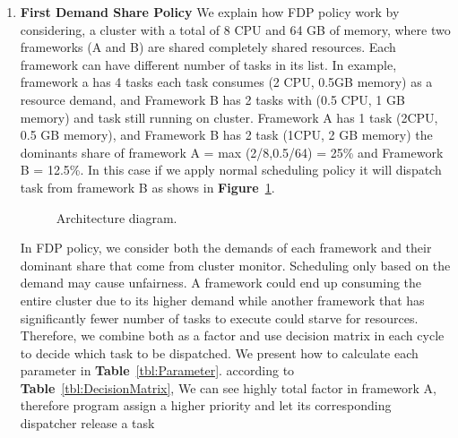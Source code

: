 \documentclass[12pt,oneside,openright,a4paper]{cpe-english-project}
\begin{document}
\begin{enumerate}
  \item \textbf{First Demand Share Policy} We explain how FDP policy work by considering, a cluster with a total of 8 CPU and 64 GB of memory, where two frameworks (A and B) are shared completely shared resources. Each framework can have different number of tasks in its list. In example, framework a has 4 tasks each task consumes (2 CPU, 0.5GB memory) as a resource demand, and Framework B has 2 tasks with (0.5 CPU, 1 GB memory) and task still running on cluster. Framework A has 1 task (2CPU, 0.5 GB memory), and Framework B has 2 task (1CPU, 2 GB memory) the dominants share of framework A = max (2/8,0.5/64) = 25\% and Framework B = 12.5\%. In this case if we apply normal scheduling policy it will dispatch task from framework B as shows in \textbf{Figure}~\ref{fig:flowDiagram}.

  \begin{figure}[!h]\centering
    \setlength{\fboxrule}{0mm} %
    \setlength{\fboxsep}{0cm}
    \caption{Architecture diagram.}\label{fig:flowDiagram}
  \end{figure}

\hspace{10mm}In FDP policy, we consider both the demands of each framework and their dominant share that come from cluster monitor. Scheduling only based on the demand may cause unfairness. A framework could end up consuming the entire cluster due to its higher demand while another framework that has significantly fewer number of tasks to execute could starve for resources. Therefore, we combine both as a factor and use decision matrix in each cycle to decide which task to be dispatched. We present how to calculate each parameter in \textbf{Table}~\ref{tbl:Parameter}. according to \textbf{Table}~\ref{tbl:DecisionMatrix}, We can see highly total factor in framework A, therefore program assign a higher priority and let its corresponding dispatcher release a task


\end{enumerate}
\end{document}
